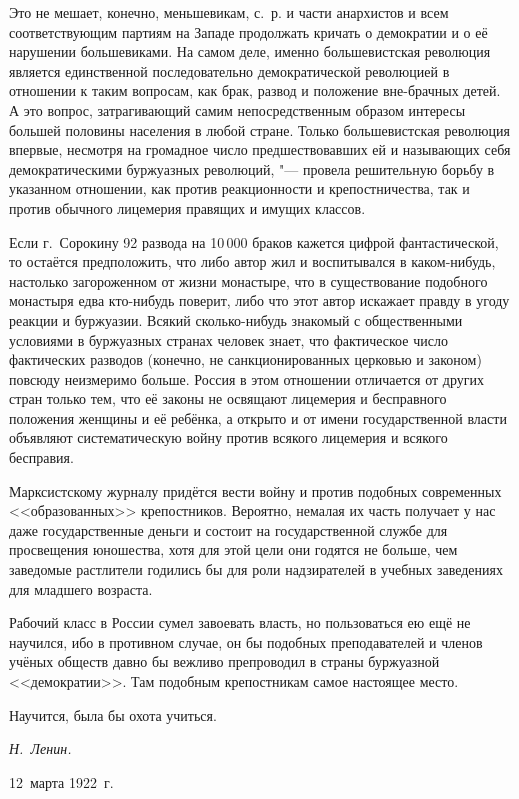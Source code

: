 Это не мешает, конечно, меньшевикам, с.~р. и части анархистов и всем
соответствующим партиям на Западе продолжать кричать о демократии и о её
нарушении большевиками. На самом деле, именно большевистская революция
является единственной последовательно демократической революцией в
отношении к таким вопросам, как брак, развод и положение вне-брачных детей.
А это вопрос, затрагивающий самим непосредственным образом интересы большей
половины населения в любой стране. Только большевистская революция впервые,
несмотря на громадное число предшествовавших ей и называющих себя
демократическими буржуазных революций, "--- провела решительную борьбу в
указанном отношении, как против реакционности и крепостничества, так и
против обычного лицемерия правящих и имущих классов.

Если г.~Сорокину 92 развода на 10\,000 браков кажется
цифрой фантастической, то остаётся предположить, что либо автор жил и
воспитывался в каком-нибудь, настолько загороженном от жизни монастыре, что
в существование подобного монастыря едва кто-нибудь поверит, либо что этот
автор искажает правду в угоду реакции и буржуазии. Всякий сколько-нибудь
знакомый с общественными условиями в буржуазных странах человек знает, что
фактическое число фактических разводов (конечно, не санкционированных
церковью и законом) повсюду неизмеримо больше. Россия в этом отношении
отличается от других стран только тем, что её законы не освящают лицемерия
и бесправного положения женщины и её ребёнка, а открыто и от имени
государственной власти объявляют систематическую войну против всякого
лицемерия и всякого бесправия.

Марксистскому журналу придётся вести войну и против подобных современных
<<образованных>> крепостников. Вероятно, немалая их часть получает у нас даже
государственные деньги и состоит на государственной службе для просвещения
юношества, хотя для этой цели они годятся не больше, чем заведомые
растлители годились бы для роли надзирателей в учебных заведениях для
младшего возраста.

Рабочий класс в России сумел завоевать власть, но пользоваться ею ещё не
научился, ибо в противном случае, он бы подобных преподавателей и членов
учёных обществ давно бы вежливо препроводил в страны буржуазной
<<демократии>>. Там подобным крепостникам самое настоящее место.

Научится, была бы охота учиться.

{\raggedleft \textit{Н.~Ленин.} \par}

12~марта 1922~г.


\bigskip
